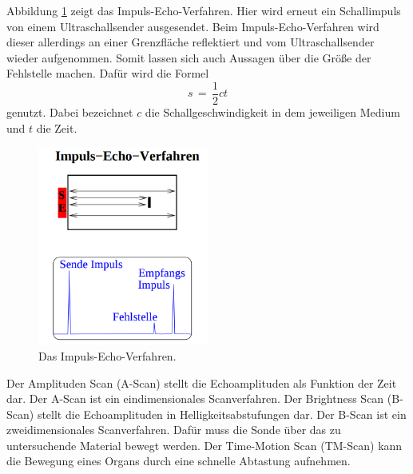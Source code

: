 \documentclass[
  bibliography=totoc,     %
  captions=tableheading,  %
  titlepage=firstiscover, %
]{scrartcl}
\begin{document}
\clearpage
\noindent
Abbildung \ref{fig:US23} zeigt das Impuls-Echo-Verfahren. Hier wird erneut ein
Schallimpuls von einem Ultraschallsender ausgesendet. Beim
Impuls-Echo-Verfahren wird dieser allerdings an einer Grenzfläche reflektiert
und vom Ultraschallsender wieder aufgenommen. Somit lassen sich auch Aussagen
über die Größe der Fehlstelle machen. Dafür wird die Formel
\begin{equation}
  s\,=\, \frac{1}{2} c t
  \label{eqn:strecke}
\end{equation}
genutzt. Dabei bezeichnet $c$ die Schallgeschwindigkeit in dem jeweiligen
Medium und $t$ die Zeit.
\begin{figure}[H]
  \centering
  \includegraphics[width=0.5\textwidth]{US23.png}
  \caption{Das Impuls-Echo-Verfahren. \cite{anleitung}}
  \label{fig:US23}
\end{figure}
\noindent
Der Amplituden Scan (A-Scan) stellt die Echoamplituden als Funktion der Zeit
dar. Der A-Scan ist ein eindimensionales Scanverfahren.
Der Brightness Scan (B-Scan) stellt die Echoamplituden in
Helligkeitsabstufungen dar. Der B-Scan ist ein zweidimensionales Scanverfahren.
Dafür muss die Sonde über das zu untersuchende Material bewegt werden.
Der Time-Motion Scan (TM-Scan) kann die Bewegung eines Organs durch eine
schnelle Abtastung aufnehmen.
\end{document}
